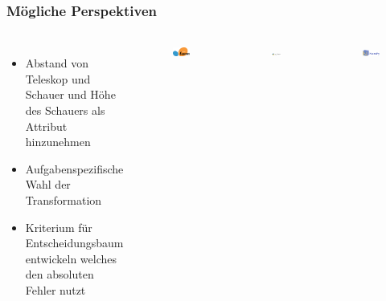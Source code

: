 \documentclass[aspectratio=1610, professionalfonts, 9pt]{beamer}
\begin{document}
  \begin{frame}
    \frametitle{Mögliche Perspektiven}
    \begin{columns}
      \begin{itemize}
        \item Abstand von Teleskop und Schauer und Höhe des Schauers als Attribut hinzunehmen
        \item Aufgabenspezifische Wahl der Transformation
        \item Kriterium für Entscheidungsbaum entwickeln welches den absoluten Fehler nutzt
      \end{itemize}
      \begin{figure}
        \includegraphics[width=\textwidth]{pictures/sklearn.png}
      \end{figure}
      \begin{figure}
        \includegraphics[width=\textwidth]{pictures/python.png}
      \end{figure}
      \begin{figure}
        \includegraphics[width=\textwidth]{pictures/numpy.png}
      \end{figure}


\end{columns}
\end{frame}
\end{document}
